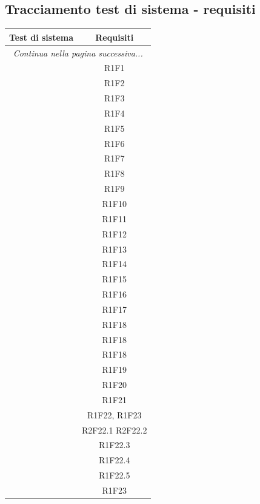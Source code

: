 \subsection{Tracciamento test di sistema - requisiti}

\resetCTS
\begin{center}
	\begin{longtable}{c|c|}
	\hline
	\rowcolor{lighter-grayer}
	\textbf{Test di sistema} & \textbf{Requisiti} \\
	\hline
	\endfirsthead
	\hline
	\multicolumn{2}{|c|}{\textit{Continua nella pagina successiva...}} \\
	\hline
	\endfoot
	\endlastfoot

	\hline
	 & R1F1 \\
	 & R1F2 \\
	 & R1F3 \\
	 & R1F4 \\
	 & R1F5 \\
	 & R1F6 \\
	 & R1F7 \\
	 & R1F8 \\
	 & R1F9 \\
	 & R1F10 \\

	 & R1F11  \\
	 & R1F12 \\
	 & R1F13 \\
	 & R1F14 \\
	 & R1F15 \\
	 & R1F16 \\
	 & R1F17 \\
	 & R1F18 \\
	 & R1F18 \\
	 & R1F18 \\

	 & R1F19 \\
	 & R1F20 \\
	 & R1F21 \\
	 & R1F22, R1F23 \\
	 & R2F22.1 R2F22.2 \\
	 & R1F22.3 \\
	 & R1F22.4 \\
	 & R1F22.5 \\
	 & R1F23 \\
	\hline

	\end{longtable}
\end{center}



